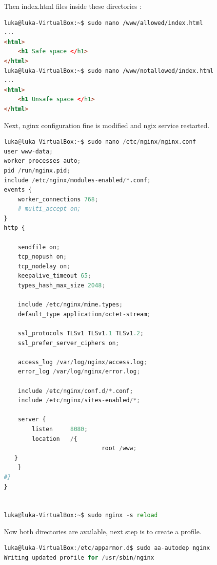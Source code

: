 \documentclass[12pt,a4paper]{article} %
\begin{document}
Then index.html files inside these directories : 
\begin{mdframed}[backgroundcolor=light-gray, roundcorner=10pt,leftmargin=1, rightmargin=1, innerleftmargin=15, innertopmargin=15,innerbottommargin=15, outerlinewidth=1, linecolor=light-gray] \begin{lstlisting}[language=html] 
luka@luka-VirtualBox:~$ sudo nano /www/allowed/index.html
...
<html>
    <h1 Safe space </h1>
</html>
luka@luka-VirtualBox:~$ sudo nano /www/notallowed/index.html
...
<html>
    <h1 Unsafe space </h1>
</html>
\end{lstlisting} \end{mdframed}
Next, nginx configuration fine is modified and ngix service restarted. 
\begin{mdframed}[backgroundcolor=light-gray, roundcorner=10pt,leftmargin=1, rightmargin=1, innerleftmargin=15, innertopmargin=15,innerbottommargin=15, outerlinewidth=1, linecolor=light-gray] \begin{lstlisting}[language=python] 
luka@luka-VirtualBox:~$ sudo nano /etc/nginx/nginx.conf
user www-data;
worker_processes auto;
pid /run/nginx.pid;
include /etc/nginx/modules-enabled/*.conf;
events {
	worker_connections 768;
	# multi_accept on;
}
http {

	sendfile on;
	tcp_nopush on;
	tcp_nodelay on;
	keepalive_timeout 65;
	types_hash_max_size 2048;

	include /etc/nginx/mime.types;
	default_type application/octet-stream;

	ssl_protocols TLSv1 TLSv1.1 TLSv1.2; 
	ssl_prefer_server_ciphers on;

	access_log /var/log/nginx/access.log;
	error_log /var/log/nginx/error.log;

	include /etc/nginx/conf.d/*.conf;
	include /etc/nginx/sites-enabled/*;

	server {
		listen     8080;
		location   /{
                            root /www;
   }
	}
#}
}


luka@luka-VirtualBox:~$ sudo nginx -s reload

\end{lstlisting} \end{mdframed}
Now both directories are available, next step is to create a profile.
\begin{mdframed}[backgroundcolor=light-gray, roundcorner=10pt,leftmargin=1, rightmargin=1, innerleftmargin=15, innertopmargin=15,innerbottommargin=15, outerlinewidth=1, linecolor=light-gray] \begin{lstlisting}[language=C]
luka@luka-VirtualBox:/etc/apparmor.d$ sudo aa-autodep nginx
Writing updated profile for /usr/sbin/nginx
\end{lstlisting} \end{mdframed}
\end{document}
